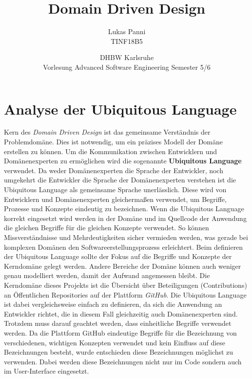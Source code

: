 \documentclass[12pt]{article}
\title{Domain Driven Design}
\date{DHBW Karlsruhe\\ Vorlesung Advanced Software Engineering Semester 5/6}
\author{Lukas Panni \\ TINF18B5}
\begin{document}
\maketitle

\newpage
\tableofcontents
\newpage

\section{Analyse der Ubiquitous Language}
\label{sec:ubiq_lang}

Kern des \textit{Domain Driven Design} ist das gemeinsame Verständnis der Problemdomäne. Dies ist notwendig, um ein präzises Modell der Domäne erstellen zu können.
Um die Kommunikation zwischen Entwicklern und Domänenexperten zu ermöglichen wird die sogenannte \textbf{Ubiquitous  Language} verwendet.
Da weder Domänenexperten die Sprache der Entwickler, noch umgekehrt die Entwickler die Sprache der Domänenexperten verstehen ist die Ubiquitous Language als gemeinsame Sprache unerlässlich.
Diese wird von Entwicklern und Domänenexperten gleichermaßen verwendet, um Begriffe, Prozesse und Konzepte eindeutig zu bezeichnen.
Wenn die Ubiquitous Language korrekt eingesetzt wird werden in der Domäne und im Quellcode der Anwendung die gleichen Begriffe für die gleichen Konzepte verwendet.
So können Missverständnisse und Mehrdeutigkeiten sicher vermieden werden, was gerade bei komplexen Domänen den Softwareerstellungsprozess erleichtert.
Beim definieren der Ubiquitous Language sollte der Fokus auf die Begriffe und Konzepte der Kerndomäne gelegt werden.
Andere Bereiche der Domäne können auch weniger genau modelliert werden, damit der Aufwand angemessen bleibt.
\newline
\newline
Die Kerndomäne dieses Projekts ist die Übersicht über Beteiligungen (Contributions) an Öffentlichen Repositories auf der Plattform \textit{GitHub}.
Die Ubiquitous Language ist dabei vergleichsweise einfach zu definieren, da sich die Anwendung an Entwickler richtet, die in diesem Fall gleichzeitig auch Domänenexperten sind.
Trotzdem muss darauf geachtet werden, dass einheitliche Begriffe verwendet werden.
Da die Plattform GitHub eindeutige Begriffe für die Bezeichnung von verschiedenen, wichtigen Konzepten verwendet und kein Einfluss auf diese Bezeichnungen besteht, wurde entschieden diese Bezeichnungen möglichst zu verwenden. Dabei werden diese Bezeichnungen nicht nur im Code sondern auch im User-Interface eingesetzt.
\end{document}
